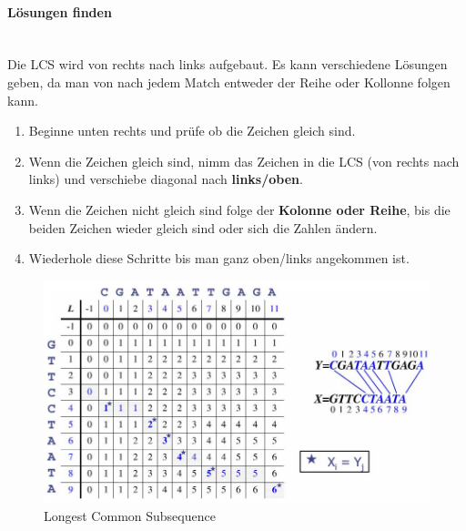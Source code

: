 \paragraph{Lösungen finden} \hfill \\
Die LCS wird von  rechts nach links aufgebaut. Es kann verschiedene Lösungen geben, da man von nach jedem Match entweder der Reihe oder Kollonne folgen kann.
\begin{enumerate}
	\item Beginne unten rechts und prüfe ob die Zeichen gleich sind. 
	\item Wenn die Zeichen gleich sind, nimm das Zeichen in die LCS (von rechts nach links) und verschiebe diagonal nach \textbf{links/oben}.
	\item Wenn die Zeichen nicht gleich sind folge der \textbf{Kolonne oder Reihe}, bis die beiden Zeichen wieder gleich sind oder sich die Zahlen ändern.
	\item Wiederhole diese Schritte bis man ganz oben/links angekommen ist.
\end{enumerate}


\begin{figure}[h]
\centering
\includegraphics[width=\linewidth]{images/dynamische_prog_lcs}
\caption{Longest Common Subsequence}
\label{fig:dynamischeproglcs}
\end{figure}

\clearpage

